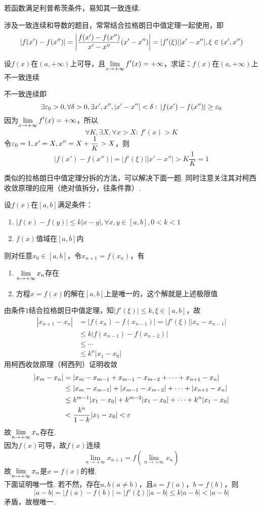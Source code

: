 \par 若函数满足利普希茨条件，易知其一致连续.
\par 涉及一致连续和导数的题目，常常结合拉格朗日中值定理一起使用，即
\[|f(x')-f(x'')|=\left|\dfrac{f(x')-f(x'')}{x'-x''}(x'-x'')\right|=|f'(\xi)||x'-x''|,\xi\in(x',x'')\]
\begin{example}
设$f(x)$在$(a,+\infty)$上可导，且$\displaystyle\lim_{x\to+\infty}f'(x)=+\infty$，求证：$f(x)$在$(a,+\infty)$上不一致连续
\end{example}
\begin{analysis}
不一致连续即
\[\exists \varepsilon_0>0,\forall\delta>0,\exists x',x'',|x'-x''|<\delta:\,|f(x')-f(x'')|\geq\varepsilon_0\]
因为$\displaystyle\lim_{x\to+\infty}f'(x)=+\infty$，所以
\[\forall K,\exists X,\forall x>X:\,f'(x)>K\]
令$\varepsilon_0=1,x'=X,x''=X+\dfrac{1}{K}>X$，则
\[|f(x')-f(x'')|=|f'(\xi)||x'-x''|>K\dfrac{1}{K}=1\]
\end{analysis}
\par 类似的拉格朗日中值定理分拆的方法，可以解决下面一题. 同时注意关注其对柯西收敛原理的应用（绝对值拆分，往条件靠）.
\begin{example}
设$f(x)$在$[a,b]$满足条件：
\begin{enumerate}
	\itemsep -3pt
	\item $|f(x)-f(y)|\leq k|x-y|,\forall x,y\in[a,b],0<k<1$
	\item $f(x)$值域在$[a,b]$内
\end{enumerate}
则对任意$x_0\in[a,b]$，令$x_{n+1}=f(x_n)$，有
\begin{enumerate}
	\itemsep -3pt
	\item $\displaystyle\lim_{n\to+\infty}x_n$存在
	\item 方程$x=f(x)$的解在$[a,b]$上是唯一的，这个解就是上述极限值
\end{enumerate}
\end{example}
\begin{analysis}
由条件$1$结合拉格朗日中值定理，知$|f'(\xi)|\leq k,\xi\in[a,b]$，故
\[\begin{aligned}
|x_{n+1}-x_n|&=|f(x_n)-f(x_{n-1})|=|f'(\xi)||x_n-x_{n-1}|\\
&\leq k|f(x_{n-1})-f(x_{n-2})|\\
&\leq \cdots\\
&\leq k^n|x_1-x_0|
\end{aligned}\]
用柯西收敛原理（柯西列）证明收敛
\[\begin{aligned}
|x_m-x_n|&=|x_m-x_{m-1}+x_{m-1}-x_{m-2}+\cdots+x_{n+1}-x_n|\\
&\leq|x_m-x_{m-1}|+|x_{m-1}-x_{m-2}|+\cdots+|x_{n+1}-x_n|\\
&\leq k^{m-1}|x_1-x_0|+k^{m-2}|x_1-x_0|+\cdots+k^{n}|x_1-x_0|\\
&< \dfrac{k^n}{1-k}|x_1-x_0| < \varepsilon
\end{aligned}\]
故$\displaystyle\lim_{n\to+\infty}x_n$存在.\\
因为$f(x)$可导，故$f(x)$连续
\[\lim_{n\to+\infty}x_{n+1}=f(\lim_{n\to+\infty}x_n)\]
故$\displaystyle\lim_{n\to+\infty}x_n$是$x=f(x)$的根.\\
下面证明唯一性. 若不然，存在$a,b(a\ne b)$，且$a=f(a)$，$b=f(b)$，则
\[|a-b|=|f(a)-f(b)|=|f'(\xi)||a-b|\leq k|a-b|<|a-b|\]
矛盾，故根唯一.
\end{analysis}